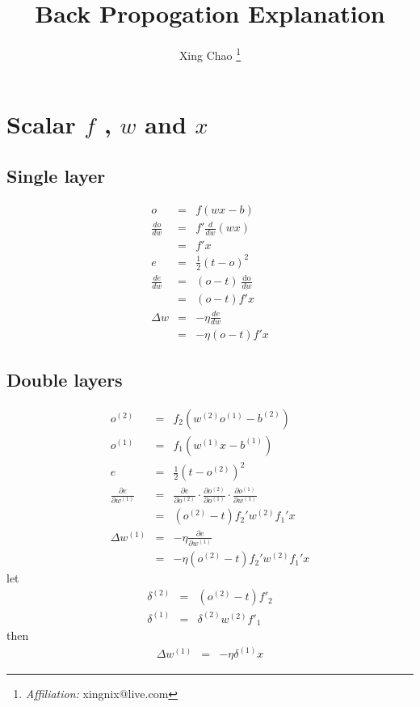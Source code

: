 \documentclass{article}
\newcommand{\cdummy}{\cdot}
\newcommand{\tmaffiliation}[1]{\thanks{\textit{Affiliation:} #1}}
\newcommand{\tmop}[1]{\ensuremath{\operatorname{#1}}}
\begin{document}
\title{Back Propogation Explanation}

\author{
  Xing Chao
  \tmaffiliation{xingnix@live.com}
}

\maketitle

\section{Scalar $f$ , $w$ and $x$}

\subsection{Single layer}

\begin{eqnarray*}
  o & = & f ( w x-b )\\
  \frac{d o}{d w} & = & f' \frac{d }{d w} ( w x )\\
  & = & f' x\\
  e & = & \frac{1}{2} ( t-o )^{2}\\
  \frac{d e}{d w} & = & ( o-t ) \frac{\tmop{do}}{d w}\\
  & = & ( o-t ) f' x\\
  \Delta w & = & - \eta \frac{d e}{d w}\\
  & = & - \eta ( o-t ) f' x
\end{eqnarray*}

\subsection{Double layers}

\begin{eqnarray*}
  o^{( 2 )} & = & f_{2} ( w^{( 2 )} o^{( 1 )} -b_{}^{( 2 )} )\\
  o^{( 1 )} & = & f_{1} ( w^{( 1 )} x-b^{( 1 )} )\\
  e & = & \frac{1}{2} ( t-o^{( 2 )} )^{2}\\
  \frac{\partial e}{\partial w^{( 1 )}} & = & \frac{\partial e}{\partial o^{(
  2 )}} \cdummy \frac{\partial o^{( 2 )}}{\partial o^{( 1 )}} \cdummy
  \frac{\partial o^{( 1 )}}{\partial w^{( 1 )}}\\
  & = & ( o^{( 2 )} -t ) f_{2}' w^{( 2 )} f_{1}' x\\
  \Delta w^{( 1 )} & = & - \eta \frac{\partial e}{\partial w^{( 1 )}}\\
  & = & - \eta ( o^{( 2 )} -t ) f_{2}' w^{( 2 )} f_{1}' x
\end{eqnarray*}
let
\begin{eqnarray*}
  \delta^{( 2 )} & = & ( o^{( 2 )} -t ) f'_{2}\\
  \delta^{( 1 )} & = & \delta^{( 2 )} w^{( 2 )} f'_{1}
\end{eqnarray*}
then
\begin{eqnarray*}
  \Delta w^{( 1 )} & = & - \eta \delta^{( 1 )} x
\end{eqnarray*}
\end{document}
